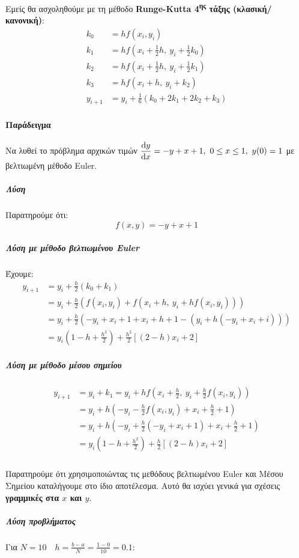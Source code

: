 \documentclass[11pt,a4paper,notitlepage,fleqn]{article}
\begin{document}
Εμείς θα ασχοληθούμε με τη μέθοδο \textbf{Runge-Kutta 4\textsuperscript{ης}
τάξης (κλασική/κανονική)}:
\[
\boxed{\begin{array}{rl}
	k_0 &= hf(x_i,y_i) \\
	k_1 &= hf(x_i+\frac{1}{2}h,\ y_i + \frac{1}{2}k_0) \\
	k_2 &= hf(x_i+\frac{1}{2}h,\ y_i+\frac{1}{2}k_1) \\
	k_3 &= hf(x_i+h,\ y_i+k_2) \\
	y_{i+1} &= \boxed{y_i+\frac{1}{6}\left(k_0+2k_1+2k_2+k_3\right)}
	\end{array}}
\]

\paragraph{Παράδειγμα}
Να λυθεί το πρόβλημα αρχικών τιμών \( \displaystyle
\od{y}{x} = -y+x+1,\ 0\leq x \leq 1,\ y(0)=1
 \) με βελτιωμένη μέθοδο Euler.
\subparagraph{Λύση}
Παρατηρούμε ότι:
\[
f(x,y) = -y+x+1
\]

\subparagraph{Λύση με μέθοδο βελτιωμένου Euler}
Έχουμε:
\begin{align*}
	y_{i+1} &= y_i +\frac{h}{2}(k_0+k_1)
	\\ &= y_i+\frac{h}{2}\left(
	f(x_i,y_i) + f\left( x_i+h,\ y_i+hf(x_i,y_i) \right)
	\right)
	\\ &= y_i + \frac{h}{2}\left(-y_i+x_i+1
	+x_i+h+1-\left(
	y_i+h(-y_i+x_i+i)
	\right)\right)
	\\ &=
	y_i\left(1-h+\frac{h^2}{2}\right) + \frac{h^2}{2}\left[
	(2-h)x_i+2
	\right] \end{align*}

\subparagraph{Λύση με μέθοδο μέσου σημείου}
	\begin{align*}
	y_{i+1} &= y_i+k_1 = y_i+hf\left(x_i+\frac{h}{2},
	\ y_i+\frac{h}{2}f(x_i,y_i)\right)
	\\ &= y_i+h\left(-y_i-\frac{h}{2}f(x_i,y_i)+x_i+\frac{h}{2}+1\right)
	\\ &= y_i +
	h\left(-y_i+\frac{h}{2}(-y_i+x_i+1)+x_i+\frac{h}{2}+1\right)
	\\ &= y_i\left(1-h+\frac{h^2}{2}\right)+\frac{h}{2}\left[
	(2-h)x_i+2
	\right]
\end{align*}

\subparagraph{}
Παρατηρούμε ότι χρησιμοποιώντας τις μεθόδους βελτιωμένου Euler και Μέσου
Σημείου καταλήγουμε στο ίδιο αποτέλεσμα. Αυτό θα ισχύει γενικά για
σχέσεις \textbf{γραμμικές στα \( x \) και \( y \)}.

\subparagraph{Λύση προβλήματος}
Για \( N=10\quad h= \frac{b-a}{N}=\frac{1-0}{10}=0.1 \):
\end{document}
